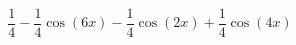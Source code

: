 \begin{displaymath}
 \frac{1}{4}-\frac{1}{4}\cos(6x) -\frac{1}{4}\cos( 2x) + \frac{1}{4}\cos( 4x)
\end{displaymath}
